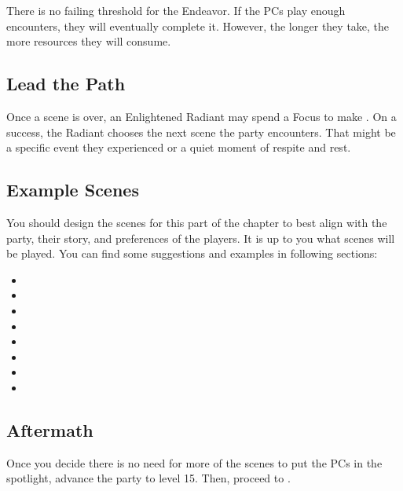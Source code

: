 There is no failing threshold for the Endeavor. If the PCs play enough encounters, they will eventually complete it. However, the longer they take, the more resources they will consume.





\subsection{Lead the Path}

Once a scene is over, an Enlightened Radiant may spend a Focus to make . On a success, the Radiant chooses the next scene the party encounters. That might be a specific event they experienced or a quiet moment of respite and rest.



\subsection{Example Scenes}

You should design the scenes for this part of the chapter to best align with the party, their story, and preferences of the players. It is up to you what scenes will be played. You can find some suggestions and examples in following sections:

\begin{itemize}
	\item {}
	\item {}
	\item {}
	\item {}
	\item {}
	\item {}
	\item {}
	\item {}
\end{itemize}










\subsection{Aftermath}

Once you decide there is no need for more of the scenes to put the PCs in the spotlight, advance the party to level 15. Then, proceed to .